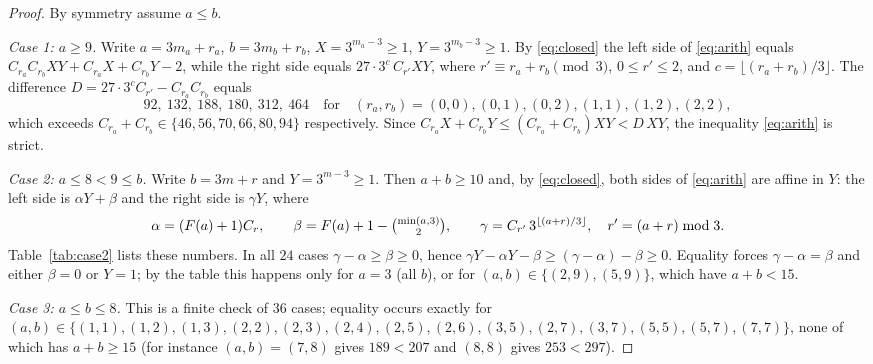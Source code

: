 \documentclass[11pt]{amsart}
\theoremstyle{definition}
\theoremstyle{remark}
\newcommand{\binomtwo}[1]{\tbinom{#1}{2}}
\begin{document}
\begin{proof}
By symmetry assume $a\le b$.

\emph{Case 1: $a\ge 9$.}
Write $a=3m_a+r_a$, $b=3m_b+r_b$, $X=3^{m_a-3}\ge1$, $Y=3^{m_b-3}\ge 1$.
By \eqref{eq:closed} the left side of \eqref{eq:arith} equals $C_{r_a}C_{r_b}XY+C_{r_a}X+C_{r_b}Y-2$, while the right side equals $27\cdot 3^{c}\,C_{r'}XY$, where $r'\equiv r_a+r_b\pmod 3$, $0\le r'\le2$, and $c=\lfloor (r_a+r_b)/3\rfloor$.
The difference $D=27\cdot 3^{c}C_{r'}-C_{r_a}C_{r_b}$ equals
\[
92,\ 132,\ 188,\ 180,\ 312,\ 464\quad\text{for}\quad (r_a,r_b)=(0,0),(0,1),(0,2),(1,1),(1,2),(2,2),
\]
which exceeds $C_{r_a}+C_{r_b}\in\{46,56,70,66,80,94\}$ respectively.
Since $C_{r_a}X+C_{r_b}Y\le(C_{r_a}+C_{r_b})XY<D\,XY$, the inequality \eqref{eq:arith} is strict.

\emph{Case 2: $a\le 8<9\le b$.}
Write $b=3m+r$ and $Y=3^{m-3}\ge 1$.
Then $a+b\ge 10$ and, by \eqref{eq:closed}, both sides of \eqref{eq:arith} are affine in $Y$: the left side is $\alpha Y+\beta$ and the right side is $\gamma Y$, where
\[
\alpha=(F(a)+1)C_r,\qquad \beta=F(a)+1-\binomtwo{\min(a,3)},\qquad \gamma=C_{r'}\,3^{\lfloor (a+r)/3\rfloor},\quad r'=(a+r)\bmod 3.
\]
Table~\ref{tab:case2} lists these numbers.
In all $24$ cases $\gamma-\alpha\ge\beta\ge0$, hence $\gamma Y-\alpha Y-\beta\ge(\gamma-\alpha)-\beta\ge 0$.
Equality forces $\gamma-\alpha=\beta$ and either $\beta=0$ or $Y=1$; by the table this happens only for $a=3$ (all $b$), or for $(a,b)\in\{(2,9),(5,9)\}$, which have $a+b<15$.

\emph{Case 3: $a\le b\le 8$.}
This is a finite check of $36$ cases; equality occurs exactly for $(a,b)\in\{(1,1),(1,2),(1,3),(2,2),(2,3),(2,4),(2,5),(2,6),(3,5),(2,7),(3,7),(5,5),(5,7),(7,7)\}$, none of which has $a+b\ge 15$ (for instance $(a,b)=(7,8)$ gives $189<207$ and $(8,8)$ gives $253<297$).
\end{proof}
\end{document}

